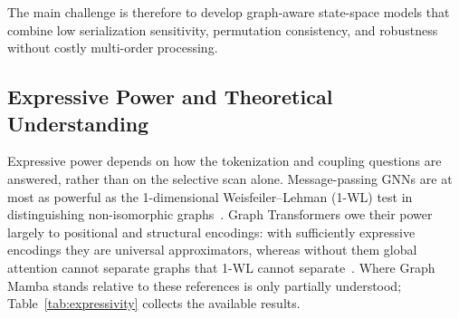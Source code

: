 \documentclass[acmsmall]{acmart}
\begin{document}
The main challenge is therefore to develop graph-aware state-space models that
combine low serialization sensitivity, permutation consistency, and robustness
without costly multi-order processing. 


\subsection{Expressive Power and Theoretical Understanding}
\label{sec:ch-expressivity}

Expressive power depends on how the tokenization and coupling questions are answered, rather than on the selective scan alone.
Message-passing GNNs are at most as powerful as the 1-dimensional
Weisfeiler--Lehman (1-WL) test in distinguishing non-isomorphic
graphs~\cite{xu2018powerful,morris2019weisfeiler}. Graph Transformers owe their
power largely to positional and structural encodings: with sufficiently
expressive encodings they are universal approximators, whereas without them
global attention cannot separate graphs that 1-WL cannot
separate~\cite{kreuzer2021rethinking,muller2023attending}. Where Graph Mamba
stands relative to these references is only partially understood;
Table~\ref{tab:expressivity} collects the available results.
\end{document}
